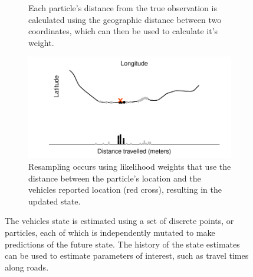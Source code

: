 \begin{figure}[tb]
\begin{subfigure}[t]{0.48\textwidth}
        \caption{Each particle's distance from the true observation is calculated using
            the geographic distance between two coordinates, which can then be used
            to calculate it's weight.}
        \label{fig:pf_state_update}
    \end{subfigure}\;\;
    \begin{subfigure}[t]{0.48\textwidth}
        \centering
        \includegraphics[width=\textwidth]{figures/03_particle_filter_4.pdf}
        \caption{Resampling occurs using likelihood weights that use the distance
            between the particle's location and the vehicles reported location (red cross),
            resulting in the updated state.}
        \label{fig:pf_state_predict2}
    \end{subfigure}
    \caption{The vehicles state is estimated using a set of discrete points, or particles,
        each of which is independently mutated to make predictions of the future state. The history of the state estimates can be used to estimate parameters of interest, such as
        travel times along roads.}
    \label{fig:pf_state}
\end{figure}




